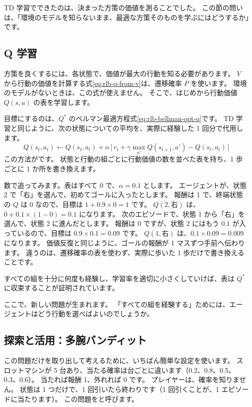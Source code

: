 TD 学習でできたのは、決まった方策の価値を測ることでした。
この節の問いは、「環境のモデルを知らないまま、最適な方策そのものを学ぶにはどうするか」です。

\subsection*{Q 学習}

方策を良くするには、各状態で、価値が最大の行動を知る必要があります。
$V$ から行動の価値を計算する式\eqref{eq:rlb-q-from-v}は、遷移確率 $P$ を使います。
環境のモデルがないときは、この式が使えません。
そこで、はじめから行動価値 $Q(s,a)$ の表を学習します。

目標にするのは、$Q^\ast$ のベルマン最適方程式\eqref{eq:rlb-bellman-opt-q}です。
TD 学習と同じように、次の状態についての平均を、実際に経験した 1 回分で代用します。
\begin{equation}
Q(s_t,a_t)\leftarrow Q(s_t,a_t)+\alpha\,\bigl[\,r_t+\gamma\max_{a'}Q(s_{t+1},a')-Q(s_t,a_t)\,\bigr]
\label{eq:rlb-q-learning}
\end{equation}
この方法がです\cite{watkins1992q}。
状態と行動の組ごとに行動価値の数を並べた表を持ち、1 歩ごとに 1 か所を書き換えます。

数で追ってみます。表はすべて 0 で、$\alpha=0.1$ とします。
エージェントが、状態 2 で「右」を選んで、初めてゴールに入ったとします。
報酬は 1 で、終端状態の $Q$ は 0 なので、目標は $1+0.9\times0=1$ です。
$Q(2,\text{右})$ は、$0+0.1\times(1-0)=0.1$ になります。
次のエピソードで、状態 1 から「右」を選んで、状態 2 に進んだとします。
報酬は 0 ですが、状態 2 にはもう $0.1$ が入っているので、目標は $0.9\times0.1=0.09$ です。
$Q(1,\text{右})$ は、$0.1\times0.09=0.009$ になります。
価値反復と同じように、ゴールの報酬が 1 マスずつ手前へ伝わります。
違うのは、遷移確率の表を使わず、実際に歩いた 1 歩だけで書き換えることです。

すべての組を十分に何度も経験し、学習率を適切に小さくしていけば、表は $Q^\ast$ に収束することが証明されています\cite{watkins1992q}。

ここで、新しい問題が生まれます。
「すべての組を経験する」ためには、エージェントはどう行動を選べばよいのでしょうか。

\subsection*{探索と活用：多腕バンディット}

この問題だけを取り出して考えるために、いちばん簡単な設定を使います。
スロットマシンが 5 台あり、当たる確率は台ごとに違います（0.2、0.8、0.5、0.3、0.6）。
当たれば報酬 1、外れれば 0 です。
プレイヤーは、確率を知りません。
状態は 1 つだけで、1 回引いたら終わりです（1 回引くことが、1 エピソードに当たります）。
この問題をと呼びます。

